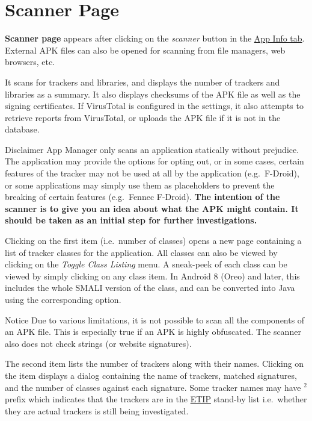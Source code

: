 \section{Scanner Page}\label{sec:scanner-page} %
\textbf{Scanner page} appears after clicking on the \emph{scanner} button in the \hyperref[subsec:app-info-tab]{App Info tab}.
External APK files can also be opened for scanning from file managers, web browsers, etc.

It scans for trackers and libraries, and displays the number of trackers and libraries as a summary. It also displays
checksums of the APK file as well as the signing certificates. If VirusTotal is configured in the settings,
it also attempts to retrieve reports from VirusTotal, or uploads the APK file if it is not in the database.

\begin{danger}{Disclaimer}
    App Manager only scans an application statically without prejudice. The application may provide the options for opting out,
    or in some cases, certain features of the tracker may not be used at all by the application (e.g.\ F-Droid),
    or some applications may simply use them as placeholders to prevent the breaking of certain features (e.g.\ Fennec F-Droid).
    \textbf{The intention of the scanner is to give you an idea about what the APK might contain. It should be taken as an initial step for further investigations.}
\end{danger}

Clicking on the first item (i.e.\ number of classes) opens a new page containing a list of tracker classes for the application.
All classes can also be viewed by clicking on the \textit{Toggle Class Listing} menu.
A sneak-peek of each class can be viewed by simply clicking on any class item. In Android 8 (Oreo) and later,
this includes the whole SMALI version of the class, and can be converted into Java using the corresponding option.

\begin{tip}{Notice}
    Due to various limitations, it is not possible to scan all the components of an APK file. This is especially true if
    an APK is highly obfuscated. The scanner also does not check strings (or website signatures).
\end{tip}

The second item lists the number of trackers along with their names. Clicking on the item displays a dialog containing
the name of trackers, matched signatures, and the number of classes against each signature. Some tracker names may have
$^2$ prefix which indicates that the trackers are in the \href{https://etip.exodus-privacy.eu.org}{ETIP} stand-by list
i.e.\ whether they are actual trackers is still being investigated.

